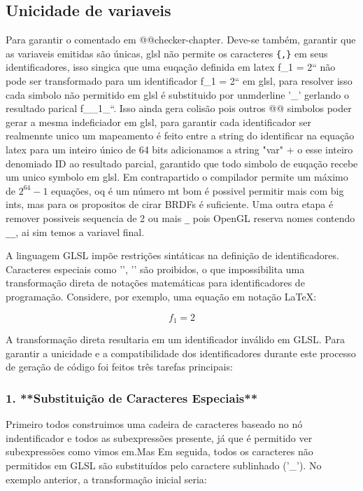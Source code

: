 \subsection{Unicidade de variaveis}

Para garantir o comentado em @@checker-chapter. Deve-se também, garantir que as variaveis emitidas são únicas, glsl não permite os caracteres \verb'{,}' em seus identificadores, isso singica que uma euqação definida em latex \verb``f_{1} = 2`` não pode ser transformado para um identificador \verb``f_{1} = 2`` em glsl, para resolver isso cada simbolo não permitido em glsl é substituido por unmderline '_' gerlando o resultado parical \verb``f__1_``. Isso ainda gera colisão pois outros @@ simbolos poder gerar a mesma indeficiador em glsl, para garantir cada identificador ser realmennte unico um mapeamento é feito entre a string do identificar na equação latex para um inteiro único de 64 bits adicionamos a string "var" + o esse inteiro denomiado ID ao resultado parcial, garantido que todo simbolo de euqação recebe um unico symbolo em glsl. Em contrapartido o compilador permite um máximo de $2^64 - 1$ equações, oq é um número mt bom é possivel permitir mais com big ints, mas para os propositos de cirar BRDFs é suficiente. Uma outra etapa é remover possiveis sequencia de 2 ou mais \verb"_" pois OpenGL reserva nomes contendo \verb"__", ai sim temos a variavel final.

A linguagem GLSL impõe restrições sintáticas na definição de identificadores. Caracteres especiais como '{', '}' são proibidos, o que impossibilita uma transformação direta de notações matemáticas para identificadores de programação. Considere, por exemplo, uma equação em notação LaTeX:


\[ f_{1} = 2 \]

A transformação direta resultaria em um identificador inválido em GLSL.
Para garantir a unicidade e a compatibilidade dos identificadores durante este processo de geração de código foi feitos três tarefas principais:

\subsubsection{1. **Substituição de Caracteres Especiais**}
   
   Primeiro todos construimos uma cadeira de caracteres baseado no nó indentificador e todos as subexpressões presente, já que é permitido ver subexpressões como vimos em.Mas Em seguida, todos os caracteres não permitidos em GLSL são substituídos pelo caractere sublinhado ('_'). No exemplo anterior, a transformação inicial seria:

